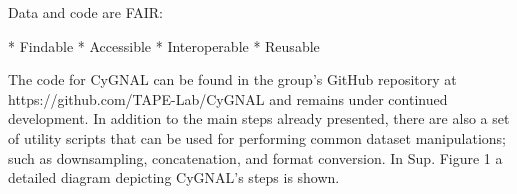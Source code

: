Data and code are FAIR:

* Findable
* Accessible
* Interoperable
* Reusable

The code for CyGNAL can be found in the group’s GitHub repository at  https://github.com/TAPE-Lab/CyGNAL and remains under continued development. In addition to the main steps already presented, there are also a set of utility scripts that can be used for performing common dataset manipulations; such as downsampling, concatenation, and format conversion. In Sup. Figure 1 a detailed diagram depicting CyGNAL’s steps is shown.








        
        
